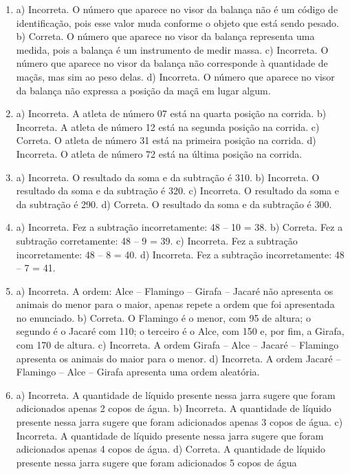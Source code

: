 \begin{enumerate}
\item
a) Incorreta. O número que aparece no visor da balança não é um código
de identificação, pois esse valor muda conforme o objeto que está sendo
pesado.
b) Correta. O número que aparece no visor da balança representa uma
medida, pois a balança é um instrumento de medir massa.
c) Incorreta. O número que aparece no visor da balança não corresponde à
quantidade de maçãs, mas sim ao peso delas.
d) Incorreta. O número que aparece no visor da balança não expressa a
posição da maçã em lugar algum.

\item
a) Incorreta. A atleta de número 07 está na quarta posição na corrida.
b) Incorreta. A atleta de número 12 está na segunda posição na corrida.
c) Correta. O atleta de número 31 está na primeira posição na corrida.
d) Incorreta. O atleta de número 72 está na última posição na corrida.

\item
a) Incorreta. O resultado da soma e da subtração é 310.
b) Incorreta. O resultado da soma e da subtração é 320.
c) Incorreta. O resultado da soma e da subtração é 290.
d) Correta. O resultado da soma e da subtração é 300.

\item
a) Incorreta. Fez a subtração incorretamente: 48 -- 10 = 38.
b) Correta. Fez a subtração corretamente: 48 -- 9 = 39.
c) Incorreta. Fez a subtração incorretamente: 48 -- 8 = 40.
d) Incorreta. Fez a subtração incorretamente: 48 -- 7 = 41.

\item
a) Incorreta. A ordem: Alce -- Flamingo -- Girafa -- Jacaré não
apresenta os animais do menor para o maior, apenas repete a ordem que
foi apresentada no enunciado.
b) Correta. O Flamingo é o menor, com 95 de altura; o segundo é o Jacaré
com 110; o terceiro é o Alce, com 150 e, por fim, a Girafa, com 170 de
altura.
c) Incorreta. A ordem Girafa -- Alce -- Jacaré -- Flamingo apresenta
os animais do maior para o menor.
d) Incorreta. A ordem Jacaré -- Flamingo -- Alce -- Girafa apresenta
uma ordem aleatória.

\item
a) Incorreta. A quantidade de líquido presente nessa jarra sugere que
foram adicionados apenas 2 copos de água.
b) Incorreta. A quantidade de líquido presente nessa jarra sugere que
foram adicionados apenas 3 copos de água.
c) Incorreta. A quantidade de líquido presente nessa jarra sugere que
foram adicionados apenas 4 copos de água.
d) Correta. A quantidade de líquido presente nessa jarra sugere que
foram adicionados 5 copos de água


\end{enumerate}
